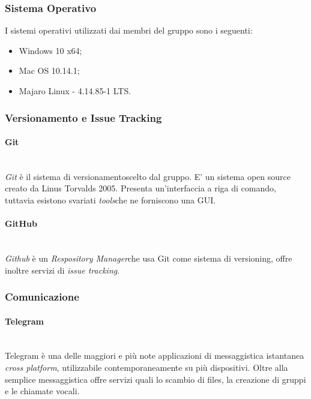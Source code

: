 \subsubsection{Sistema Operativo}
	I sistemi operativi utilizzati dai membri del gruppo sono i seguenti:
	\begin{itemize}
	\item Windows 10 x64;
	\item Mac OS 10.14.1;
	\item Majaro Linux - 4.14.85-1 LTS.
	\end{itemize}

\subsubsection{Versionamento e Issue Tracking}

\paragraph{Git} ~\\
	\textit{Git} è il sistema di versionamento\glossario scelto dal gruppo. E' un sistema open source creato da Linus 	Torvalds 2005. Presenta un'interfaccia a riga di comando, tuttavia esistono svariati \textit{tools}\glossario 	che 	ne forniscono una GUI.

\paragraph{GitHub} ~\\
	\textit{Github} è un \textit{Respository Manager}\glossario che usa Git come sistema di versioning, offre inoltre 	servizi di \textit{issue tracking}\glossario.

\subsubsection{Comunicazione}

\paragraph{Telegram} ~\\
	Telegram è una delle maggiori e più note applicazioni di messaggistica istantanea \textit{cross platform}, 					utilizzabile contemporaneamente su più dispositivi. Oltre alla semplice messaggistica offre servizi quali lo 				scambio di files, la creazione di gruppi e le chiamate vocali.

